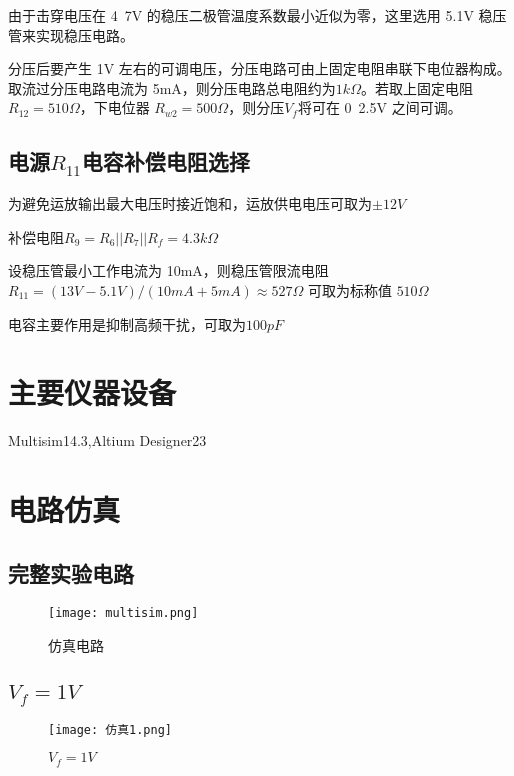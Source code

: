 \documentclass{zjureport}
\begin{document}
由于击穿电压在 4~7V 的稳压二极管温度系数最小近似为零，这里选用 5.1V 稳压管来实现稳压电路。\par

分压后要产生 1V 左右的可调电压，分压电路可由上固定电阻串联下电位器构成。取流过分压电路电流为 5mA，则分压电路总电阻约为$1k\Omega$。若取上固定电阻 $R_{12}=510\Omega$，下电位器 $R_{w2} = 500\Omega$，则分压$V_f$将可在 0~2.5V 之间可调。

\subsection{电源$R_{11}$电容补偿电阻选择}
为避免运放输出最大电压时接近饱和，运放供电电压可取为$\pm 12V$

补偿电阻$R_9 = R_6||R_7||R_f = 4.3k\Omega$\par

设稳压管最小工作电流为 10mA，则稳压管限流电阻 
\begin{math}
  R_{11} = (13V - 5.1V)/(10mA+5mA)\approx527\Omega
\end{math}
可取为标称值 $510\Omega$\par

电容主要作用是抑制高频干扰，可取为$100pF$

\section{主要仪器设备}
Multisim14.3,Altium Designer23

\section{电路仿真}

\subsection{完整实验电路}
\begin{figure}[H]
  \begin{center}
  \texttt{[image: multisim.png]}
  \end{center}
  \caption{仿真电路}
\end{figure}

\subsection{$V_f = 1V$}
\begin{figure}[h]
  \begin{center}
  \texttt{[image: 仿真1.png]}
  \end{center}
  \caption{$V_f = 1V$}
\end{figure}
\end{document}
